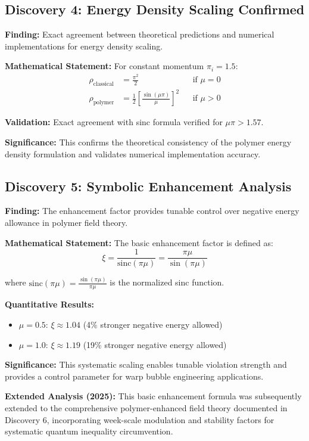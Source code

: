\documentclass[11pt]{article}
\begin{document}
\subsection{Discovery 4: Energy Density Scaling Confirmed}

\textbf{Finding:} Exact agreement between theoretical predictions and numerical implementations for energy density scaling.

\textbf{Mathematical Statement:}
For constant momentum $\pi_i = 1.5$:
\begin{align}
\rho_{\text{classical}} &= \frac{\pi^2}{2} && \text{if } \mu = 0 \\
\rho_{\text{polymer}} &= \frac{1}{2}\left[\frac{\sin(\mu\pi)}{\mu}\right]^2 && \text{if } \mu > 0
\end{align}

\textbf{Validation:} Exact agreement with sinc formula verified for $\mu\pi > 1.57$.

\textbf{Significance:} This confirms the theoretical consistency of the polymer energy density formulation and validates numerical implementation accuracy.

\subsection{Discovery 5: Symbolic Enhancement Analysis}

\textbf{Finding:} The enhancement factor provides tunable control over negative energy allowance in polymer field theory.

\textbf{Mathematical Statement:}
The basic enhancement factor is defined as:
$$\xi = \frac{1}{\text{sinc}(\pi\mu)} = \frac{\pi\mu}{\sin(\pi\mu)}$$

where $\text{sinc}(\pi\mu) = \frac{\sin(\pi\mu)}{\pi\mu}$ is the normalized sinc function.

\textbf{Quantitative Results:}
\begin{itemize}
    \item $\mu = 0.5$: $\xi \approx 1.04$ (4\% stronger negative energy allowed)
    \item $\mu = 1.0$: $\xi \approx 1.19$ (19\% stronger negative energy allowed)
\end{itemize}

\textbf{Significance:} This systematic scaling enables tunable violation strength and provides a control parameter for warp bubble engineering applications.

\textbf{Extended Analysis (2025):} This basic enhancement formula was subsequently extended to the comprehensive polymer-enhanced field theory documented in Discovery 6, incorporating week-scale modulation and stability factors for systematic quantum inequality circumvention.
\end{document}
